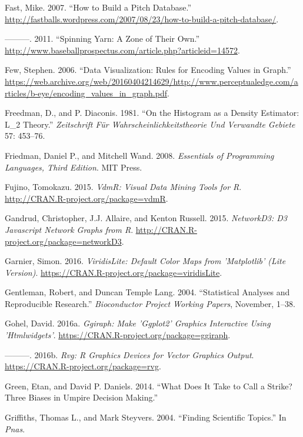 \documentclass[12pt,]{isuthesis}
\begin{document}
\hypertarget{ref-database}{}
Fast, Mike. 2007. ``How to Build a Pitch Database.''
\url{http://fastballs.wordpress.com/2007/08/23/how-to-build-a-pitch-database/}.

\hypertarget{ref-Strikezones}{}
---------. 2011. ``Spinning Yarn: A Zone of Their Own.''
\url{http://www.baseballprospectus.com/article.php?articleid=14572}.

\hypertarget{ref-few-values}{}
Few, Stephen. 2006. ``Data Visualization: Rules for Encoding Values in
Graph.''
\url{https://web.archive.org/web/20160404214629/http://www.perceptualedge.com/articles/b-eye/encoding_values_in_graph.pdf}.

\hypertarget{ref-FD}{}
Freedman, D., and P. Diaconis. 1981. ``On the Histogram as a Density
Estimator: L\_2 Theory.'' \emph{Zeitschrift Für
Wahrscheinlichkeitstheorie Und Verwandte Gebiete} 57: 453--76.

\hypertarget{ref-eopl}{}
Friedman, Daniel P., and Mitchell Wand. 2008. \emph{Essentials of
Programming Languages, Third Edition}. MIT Press.

\hypertarget{ref-vdmR}{}
Fujino, Tomokazu. 2015. \emph{VdmR: Visual Data Mining Tools for R}.
\url{http://CRAN.R-project.org/package=vdmR}.

\hypertarget{ref-networkD3}{}
Gandrud, Christopher, J.J. Allaire, and Kenton Russell. 2015.
\emph{NetworkD3: D3 Javascript Network Graphs from R}.
\url{http://CRAN.R-project.org/package=networkD3}.

\hypertarget{ref-viridisLite}{}
Garnier, Simon. 2016. \emph{ViridisLite: Default Color Maps from
'Matplotlib' (Lite Version)}.
\url{https://CRAN.R-project.org/package=viridisLite}.

\hypertarget{ref-Gentleman:Lang}{}
Gentleman, Robert, and Duncan Temple Lang. 2004. ``Statistical Analyses
and Reproducible Research.'' \emph{Bioconductor Project Working Papers},
November, 1--38.

\hypertarget{ref-ggiraph}{}
Gohel, David. 2016a. \emph{Ggiraph: Make 'Ggplot2' Graphics Interactive
Using 'Htmlwidgets'}. \url{https://CRAN.R-project.org/package=ggiraph}.

\hypertarget{ref-rvg}{}
---------. 2016b. \emph{Rvg: R Graphics Devices for Vector Graphics
Output}. \url{https://CRAN.R-project.org/package=rvg}.

\hypertarget{ref-bias}{}
Green, Etan, and David P. Daniels. 2014. ``What Does It Take to Call a
Strike? Three Biases in Umpire Decision Making.''

\hypertarget{ref-Griffiths}{}
Griffiths, Thomas L., and Mark Steyvers. 2004. ``Finding Scientific
Topics.'' In \emph{Pnas}.
\end{document}
